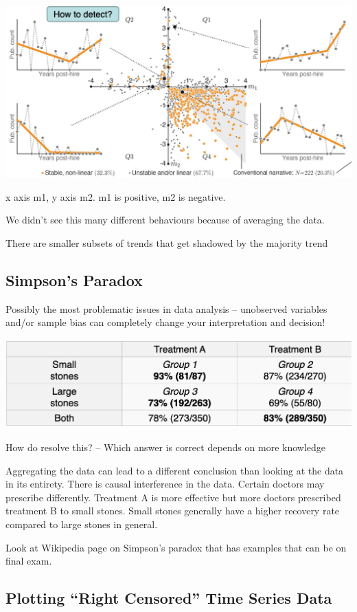 \documentclass[11pt]{article}
\theoremstyle{definition}
\begin{document}
\includegraphics[width=\textwidth]{31.png}

x axis m1, y axis m2.
m1 is positive, m2 is negative.

We didn't see this many different behaviours because of averaging the data.

There are smaller subsets of trends that get shadowed by the majority trend

\subsection{Simpson's Paradox}
Possibly the most problematic issues in data analysis –
unobserved variables and/or sample bias can completely
change your interpretation and decision!

\includegraphics[width=\textwidth]{32.png}

How do resolve this?
– Which answer is correct depends on more knowledge

Aggregating the data can lead to a different conclusion than looking at the data in its entirety.
There is causal interference in the data. Certain doctors
may prescribe differently. Treatment A is more effective but more 
doctors prescribed treatment B to small stones. Small stones 
generally have a higher recovery rate compared to large stones in general.

Look at Wikipedia page on Simpson's paradox that has examples that can be on final exam.

\subsection{Plotting “Right Censored” Time Series Data}
\end{document}
